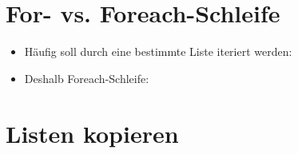 \section{For- vs. Foreach-Schleife}
\begin{frame}
    \slidehead

    \begin{itemize}
        \item Häufig soll durch eine bestimmte Liste iteriert werden:
            \pause

        \item Deshalb Foreach-Schleife:
    \end{itemize}
\end{frame}

\livecoding



\subtitle{Kapitel 5: ganz viele Variablen in einer}


\section{Listen kopieren}
\begin{frame}
    \slidehead
\end{frame}


